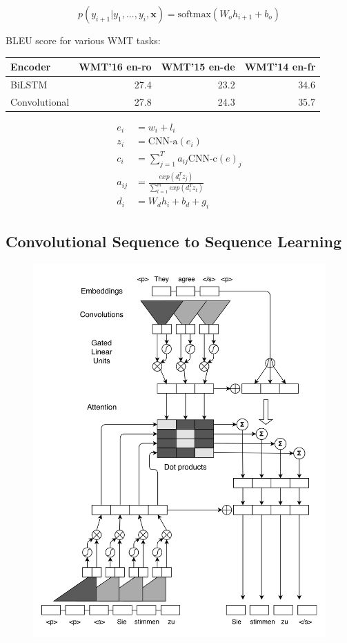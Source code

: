 \documentclass[a4paper]{article}
\begin{document}
\begin{equation*}
  p(y_{i+1} \vert y_1, ..., y_i, \textbf{x}) =
  \text{softmax}(W_o h_{i + 1} + b_o)
\end{equation*}


BLEU score for various WMT tasks:
\begin{center}
  \begin{tabular}{lrrr}
  \hline
    Encoder & WMT'16 en-ro & WMT'15 en-de & WMT'14 en-fr \\
  \hline
    BiLSTM & 27.4 & 23.2 & 34.6 \\
    Convolutional & 27.8 & 24.3 & 35.7 \\
  \hline
  \end{tabular}
\end{center}


\begin{align*}
  e_i &= w_i + l_i \\
  z_i &= \text{CNN-a}(e_i) \\
  c_i &= \sum_{j = 1}^{T}{a_{ij}\text{CNN-c}(e)_j} \\
  a_{ij} &= \frac{exp(d_i^T z_j)}{\sum_{t = 1}^{m}{exp(d_i^T z_t)}} \\
  d_i &= W_d h_i + b_d + g_i
\end{align*}


\subsection{Convolutional Sequence to Sequence Learning}

\begin{figure}
  \center
  \includegraphics[width=\textwidth]{img/CS2S}
\end{figure}
\end{document}
